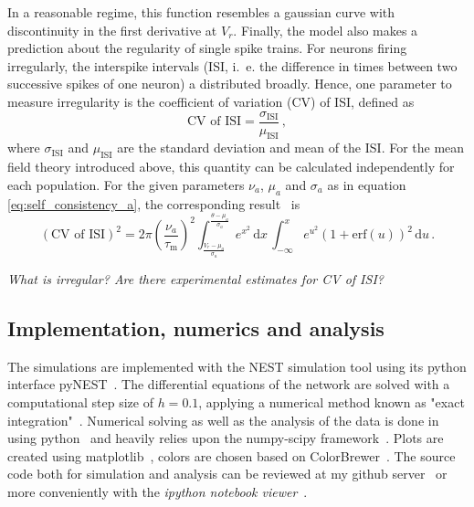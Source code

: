 In a reasonable regime, this function resembles a gaussian curve with discontinuity in the first 
derivative at $V_r$.
Finally, the model also makes a prediction about the regularity of single spike 
trains. For neurons firing irregularly, the interspike intervals
(ISI, i.~e. the difference in times between two successive spikes of one neuron) 
a distributed broadly. Hence, one parameter to measure irregularity is the coefficient 
of variation (CV) of ISI, defined as
\begin{equation}
    \text{CV of ISI} = \frac{\sigma_\text{ISI}}{\mu_\text{ISI}} \,,
    \label{eq:cv_isi}
\end{equation}
where $\sigma_\text{ISI}$ and $\mu_\text{ISI}$ are the standard deviation and mean of 
the ISI. For the mean field theory introduced above, this quantity can be calculated
independently for each population. For the given parameters $\nu_a$, $\mu_a$ and 
$\sigma_a$ as in equation \eqref{eq:self_consistency_a}, the corresponding 
result~\cite{brunel2000} is
\begin{equation}
    (\text{CV of ISI})^2 
        = 2 \pi \left(\frac{\nu_a}{\tau_\text{m}}\right)^2
            \int_{\frac{V_r - \mu_{a}}{\sigma_{a}}}^{\frac{\theta - \mu_{a}}{\sigma_{a}}} 
            e^{x^2}  \,\text{d}x  \,
            \int_{-\infty}^{x} 
            e^{u^2} \left(1 + \text{erf}(u)\right)^2 \,\text{d}u  \,.
    \label{eq:CV_ISI_mf}
\end{equation}

\emph{What is irregular? Are there experimental estimates for CV of ISI?}



 
\subsection{Implementation, numerics and analysis}
\label{subsec:analysis}
The simulations are implemented with the NEST simulation tool using its python interface
pyNEST~\cite{NEST}. The differential equations of the network are solved with a computational 
step size of $h=0.1$, applying a numerical method known as "exact integration"~\cite{rotter1999exact}.
Numerical solving as well as the analysis of the data is done in using 
python~\cite{python} and heavily relies upon the numpy-scipy framework~\cite{scipy}. 
Plots are created using matplotlib~\cite{matplotlib}, 
colors are chosen based on ColorBrewer~\cite{brewercolor}.
The source code both for simulation and analysis can be reviewed at my
github server~\cite{ba_github} or more conveniently with the 
\textit{ipython notebook viewer}~\cite{notebook_viewer}.

